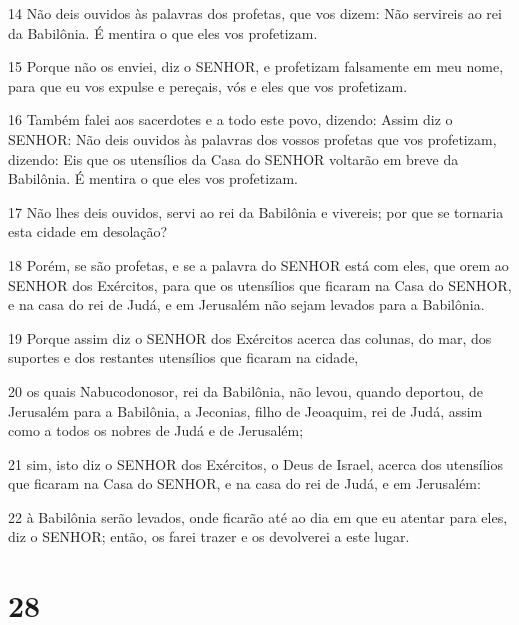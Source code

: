 \par 14 Não deis ouvidos às palavras dos profetas, que vos dizem: Não servireis ao rei da Babilônia. É mentira o que eles vos profetizam.
\par 15 Porque não os enviei, diz o SENHOR, e profetizam falsamente em meu nome, para que eu vos expulse e pereçais, vós e eles que vos profetizam.
\par 16 Também falei aos sacerdotes e a todo este povo, dizendo: Assim diz o SENHOR: Não deis ouvidos às palavras dos vossos profetas que vos profetizam, dizendo: Eis que os utensílios da Casa do SENHOR voltarão em breve da Babilônia. É mentira o que eles vos profetizam.
\par 17 Não lhes deis ouvidos, servi ao rei da Babilônia e vivereis; por que se tornaria esta cidade em desolação?
\par 18 Porém, se são profetas, e se a palavra do SENHOR está com eles, que orem ao SENHOR dos Exércitos, para que os utensílios que ficaram na Casa do SENHOR, e na casa do rei de Judá, e em Jerusalém não sejam levados para a Babilônia.
\par 19 Porque assim diz o SENHOR dos Exércitos acerca das colunas, do mar, dos suportes e dos restantes utensílios que ficaram na cidade,
\par 20 os quais Nabucodonosor, rei da Babilônia, não levou, quando deportou, de Jerusalém para a Babilônia, a Jeconias, filho de Jeoaquim, rei de Judá, assim como a todos os nobres de Judá e de Jerusalém;
\par 21 sim, isto diz o SENHOR dos Exércitos, o Deus de Israel, acerca dos utensílios que ficaram na Casa do SENHOR, e na casa do rei de Judá, e em Jerusalém:
\par 22 à Babilônia serão levados, onde ficarão até ao dia em que eu atentar para eles, diz o SENHOR; então, os farei trazer e os devolverei a este lugar.

\chapter{28}

